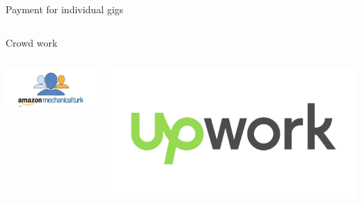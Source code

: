 \documentclass[presentation]{subfiles}
\begin{document}
\begin{frame}[t]{Payment for individual gigs}
    \begin{columns}[b]
      \begin{column}[t]{0.45\textwidth}
        \centering
        Crowd work
        \begin{columns}
          \begin{column}[b]{.5\textwidth}
            \includegraphics[max width=\linewidth,max height=\textheight,keepaspectratio]{../common_figures/amt.png}
          \end{column}
          \begin{column}[b]{.5\textwidth}
            \includegraphics[max width=\linewidth,max height=\textheight,keepaspectratio]{../common_figures/upwork.png}
          \end{column}
        \end{columns}
      \end{column}


\end{columns}
\end{frame}
\end{document}
